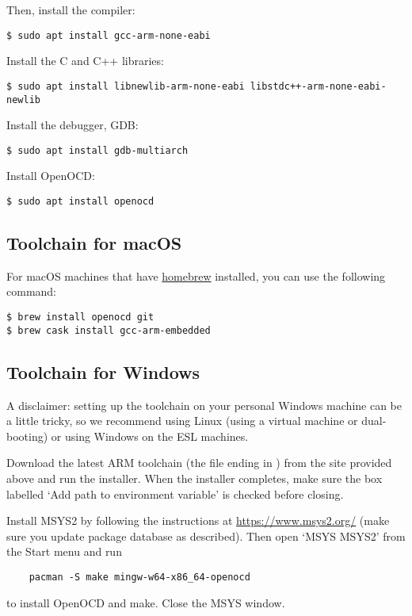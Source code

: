 Then, install the compiler:
%
\begin{verbatim}
$ sudo apt install gcc-arm-none-eabi
\end{verbatim}

Install the C and C++ libraries:
%
\begin{verbatim}
$ sudo apt install libnewlib-arm-none-eabi libstdc++-arm-none-eabi-newlib
\end{verbatim}

Install the debugger, GDB:
%
\begin{verbatim}
$ sudo apt install gdb-multiarch
\end{verbatim}

Install OpenOCD:
%
\begin{verbatim}
$ sudo apt install openocd
\end{verbatim}

\subsection{Toolchain for macOS}

For macOS machines that have \href{https://brew.sh}{homebrew}
installed, you can use the following command:

\begin{verbatim}
$ brew install openocd git
$ brew cask install gcc-arm-embedded
\end{verbatim}

\subsection{Toolchain for Windows}

A disclaimer: setting up the toolchain on your personal Windows machine can be a
little tricky, so we recommend using Linux (using a virtual machine or
dual-booting) or using Windows on the ESL machines.

Download the latest ARM toolchain (the file ending in
) from the site provided above and
run the installer. When the installer completes, make sure the box labelled
`Add path to environment variable' is checked before closing.

Install MSYS2 by following the instructions at \url{https://www.msys2.org/}
(make sure you update package database as described). Then open `MSYS MSYS2'
from the Start menu and run
\begin{verbatim}
    pacman -S make mingw-w64-x86_64-openocd
\end{verbatim}
to install OpenOCD and make. Close the MSYS window.

